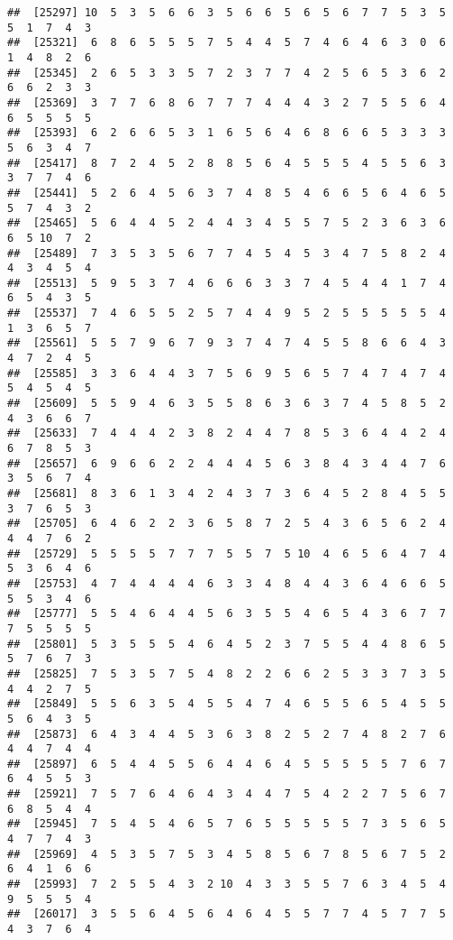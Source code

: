\documentclass[
]{book}
\begin{document}
\begin{verbatim}
##  [25297] 10  5  3  5  6  6  3  5  6  6  5  6  5  6  7  7  5  3  5  5  1  7  4  3
##  [25321]  6  8  6  5  5  5  7  5  4  4  5  7  4  6  4  6  3  0  6  1  4  8  2  6
##  [25345]  2  6  5  3  3  5  7  2  3  7  7  4  2  5  6  5  3  6  2  6  6  2  3  3
##  [25369]  3  7  7  6  8  6  7  7  7  4  4  4  3  2  7  5  5  6  4  6  5  5  5  5
##  [25393]  6  2  6  6  5  3  1  6  5  6  4  6  8  6  6  5  3  3  3  5  6  3  4  7
##  [25417]  8  7  2  4  5  2  8  8  5  6  4  5  5  5  4  5  5  6  3  3  7  7  4  6
##  [25441]  5  2  6  4  5  6  3  7  4  8  5  4  6  6  5  6  4  6  5  5  7  4  3  2
##  [25465]  5  6  4  4  5  2  4  4  3  4  5  5  7  5  2  3  6  3  6  6  5 10  7  2
##  [25489]  7  3  5  3  5  6  7  7  4  5  4  5  3  4  7  5  8  2  4  4  3  4  5  4
##  [25513]  5  9  5  3  7  4  6  6  6  3  3  7  4  5  4  4  1  7  4  6  5  4  3  5
##  [25537]  7  4  6  5  5  2  5  7  4  4  9  5  2  5  5  5  5  5  4  1  3  6  5  7
##  [25561]  5  5  7  9  6  7  9  3  7  4  7  4  5  5  8  6  6  4  3  4  7  2  4  5
##  [25585]  3  3  6  4  4  3  7  5  6  9  5  6  5  7  4  7  4  7  4  5  4  5  4  5
##  [25609]  5  5  9  4  6  3  5  5  8  6  3  6  3  7  4  5  8  5  2  4  3  6  6  7
##  [25633]  7  4  4  4  2  3  8  2  4  4  7  8  5  3  6  4  4  2  4  6  7  8  5  3
##  [25657]  6  9  6  6  2  2  4  4  4  5  6  3  8  4  3  4  4  7  6  3  5  6  7  4
##  [25681]  8  3  6  1  3  4  2  4  3  7  3  6  4  5  2  8  4  5  5  3  7  6  5  3
##  [25705]  6  4  6  2  2  3  6  5  8  7  2  5  4  3  6  5  6  2  4  4  4  7  6  2
##  [25729]  5  5  5  5  7  7  7  5  5  7  5 10  4  6  5  6  4  7  4  5  3  6  4  6
##  [25753]  4  7  4  4  4  4  6  3  3  4  8  4  4  3  6  4  6  6  5  5  5  3  4  6
##  [25777]  5  5  4  6  4  4  5  6  3  5  5  4  6  5  4  3  6  7  7  7  5  5  5  5
##  [25801]  5  3  5  5  5  4  6  4  5  2  3  7  5  5  4  4  8  6  5  5  7  6  7  3
##  [25825]  7  5  3  5  7  5  4  8  2  2  6  6  2  5  3  3  7  3  5  4  4  2  7  5
##  [25849]  5  5  6  3  5  4  5  5  4  7  4  6  5  5  6  5  4  5  5  5  6  4  3  5
##  [25873]  6  4  3  4  4  5  3  6  3  8  2  5  2  7  4  8  2  7  6  4  4  7  4  4
##  [25897]  6  5  4  4  5  5  6  4  4  6  4  5  5  5  5  5  7  6  7  6  4  5  5  3
##  [25921]  7  5  7  6  4  6  4  3  4  4  7  5  4  2  2  7  5  6  7  6  8  5  4  4
##  [25945]  7  5  4  5  4  6  5  7  6  5  5  5  5  5  7  3  5  6  5  4  7  7  4  3
##  [25969]  4  5  3  5  7  5  3  4  5  8  5  6  7  8  5  6  7  5  2  6  4  1  6  6
##  [25993]  7  2  5  5  4  3  2 10  4  3  3  5  5  7  6  3  4  5  4  9  5  5  5  4
##  [26017]  3  5  5  6  4  5  6  4  6  4  5  5  7  7  4  5  7  7  5  4  3  7  6  4

\end{verbatim}
\end{document}
